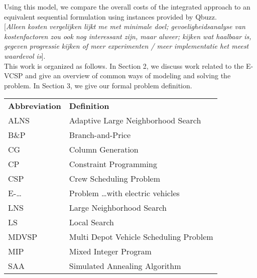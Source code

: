 \documentclass[]{article}
\newcommand{\todonocomment}[1]{{\color{red}[\textit{#1}]}}
\begin{document}
Using this model, we compare the overall costs of the integrated approach to an equivalent sequential formulation using instances provided by Qbuzz. \\
\todonocomment{Alleen kosten vergelijken lijkt me met minimale doel; gevoeligheidsanalyse van kostenfactoren zou ook nog interessant zijn, maar alweer; kijken wat haalbaar is, gegeven progressie kijken of meer experimenten / meer implementatie het meest waardevol is}. \\
This work is organized as follows. In Section 2, we discuss work related to the E-VCSP and give an overview of common ways of modeling and solving the problem. In Section 3, we give our formal problem definition.
\begin{table}
  \centering
  \begin{tabular}{ll}
    \toprule
    \multicolumn{1}{l}{\textbf{Abbreviation}} & \multicolumn{1}{l}{\textbf{Definition}}               \\
    \cmidrule(lr){1-1}\cmidrule(lr){2-2}
    ALNS                                      & Adaptive Large Neighborhood Search                   \\
    B\&P                                      & Branch-and-Price                                      \\
    CG                                        & Column Generation                                     \\
    CP                                        & Constraint Programming                                \\
    CSP                                       & Crew Scheduling Problem                               \\
    E-\dots                                   & Problem \dots with electric vehicles                  \\
    LNS                                       & Large Neighborhood Search                            \\
    LS                                        & Local Search                                          \\
    MDVSP                                     & Multi Depot Vehicle Scheduling Problem                \\
    MIP                                       & Mixed Integer Program                                 \\
    SAA                                       & Simulated Annealing Algorithm                         \\

\end{tabular}
\end{table}
\end{document}
